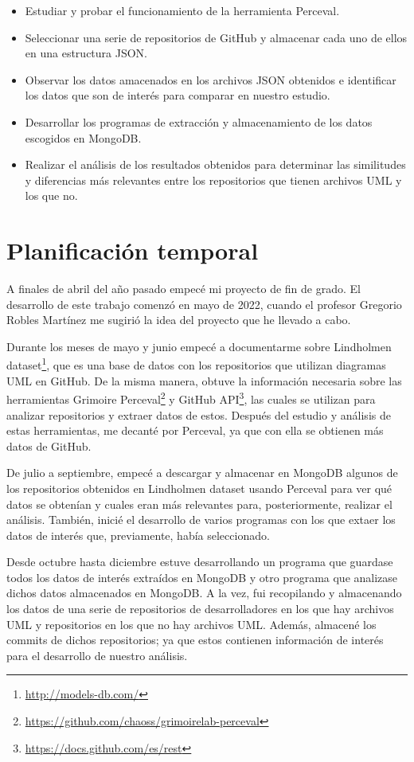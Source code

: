 \documentclass[a4paper, 12pt]{book}
\begin{document}
\begin{itemize}
  \item Estudiar y probar el funcionamiento de la herramienta Perceval.
  \item Seleccionar una serie de repositorios de GitHub y almacenar cada uno de ellos en una estructura JSON.
  \item Observar los datos amacenados en los archivos JSON obtenidos e identificar los datos que son de interés para comparar en nuestro estudio.
  \item Desarrollar los programas de extracción y almacenamiento de los datos escogidos en MongoDB.  
  \item Realizar el análisis de los resultados obtenidos para determinar las similitudes y diferencias más relevantes entre los repositorios que tienen archivos UML y los que no.
\end{itemize}


\section{Planificación temporal}
\label{sec:planificacion-temporal}

A finales de abril del año pasado empecé mi proyecto de fin de grado. 
El desarrollo de este trabajo comenzó en mayo de 2022, cuando el profesor Gregorio Robles Martínez me sugirió la idea del proyecto que he llevado a cabo. 


Durante los meses de mayo y junio empecé a documentarme sobre Lindholmen dataset\footnote{\url{http://models-db.com/}}, que es una base de datos con los repositorios que utilizan diagramas UML en GitHub.
De la misma manera, obtuve la información necesaria sobre las herramientas Grimoire Perceval\footnote{\url{https://github.com/chaoss/grimoirelab-perceval}} y GitHub API\footnote{\url{https://docs.github.com/es/rest}}, las cuales se utilizan para analizar repositorios y extraer datos de estos. 
Después del estudio y análisis de estas herramientas, me decanté por Perceval, ya que con ella se obtienen más datos de GitHub.


De julio a septiembre, empecé a descargar y almacenar en MongoDB algunos de los repositorios obtenidos en Lindholmen dataset usando Perceval para ver qué datos se obtenían y cuales eran más relevantes para, posteriormente, realizar el análisis.
También, inicié el desarrollo de varios programas con los que extaer los datos de interés que, previamente, había seleccionado.


Desde octubre hasta diciembre estuve desarrollando un programa que guardase todos los datos de interés extraídos en MongoDB y otro programa que analizase dichos datos almacenados en MongoDB.
A la vez, fui recopilando y almacenando los datos de una serie de repositorios de desarrolladores en los que hay archivos UML y repositorios en los que no hay archivos UML.
Además, almacené los commits de dichos repositorios; ya que estos contienen información de interés para el desarrollo de nuestro análisis.
\end{document}
